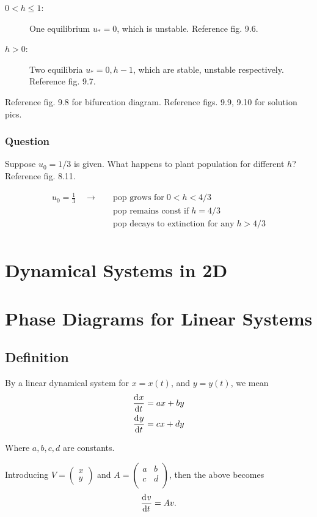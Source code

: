 \documentclass[12pt]{article}
\begin{document}
\begin{description}
\item[$0<h\le1$:] One equilibrium $u_*=0$, which is unstable. Reference fig. 9.6.
\item[$h>0$:] Two equilibria $u_*=0, h-1$, which are stable, unstable
  respectively. Reference fig. 9.7.
\end{description}
Reference fig. 9.8 for bifurcation diagram. Reference figs. 9.9, 9.10 for
solution pics.

\subsubsection*{Question}
Suppose $u_0=1/3$ is given. What happens to plant population for different $h$?
Reference fig. 8.11.

\begin{equation}
  \begin{aligned}
    u_0 = \frac{1}{3} \quad\longrightarrow \quad& \text{pop grows for}\; 0<h<4/3 \\
    & \text{pop remains const if}\; h=4/3 \\
    & \text{pop decays to extinction for any}\; h>4/3 \\
  \end{aligned}
\end{equation}

\section{Dynamical Systems in 2D}

\section{Phase Diagrams for Linear Systems}
\subsection{Definition}
By a linear dynamical system for $x=x(t)$, and $y=y(t)$, we mean
\begin{equation}
  \begin{aligned}
    \frac{\mathrm{d}^{} {x}}{\mathrm{d}{t}^{}} &= ax+by \\
    \frac{\mathrm{d}^{} {y}}{\mathrm{d}{t}^{}} &= cx+dy \\
  \end{aligned}
\end{equation}

Where $a,b,c,d$ are constants.

Introducing $V= \begin{pmatrix} x \\ y \end{pmatrix}$ and $A = \begin{pmatrix} a
  & b \\ c & d \\ \end{pmatrix}$, then the above becomes $$\frac{\mathrm{d}^{} {v}}{\mathrm{d}{t}^{}}=Av.$$
\end{document}
